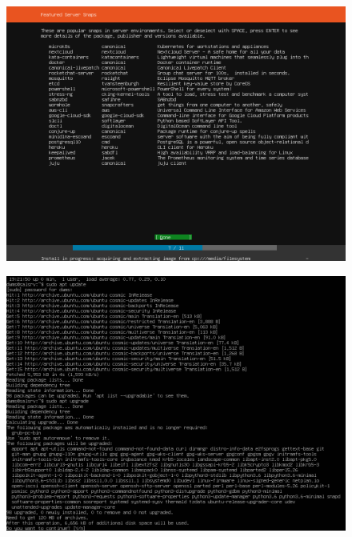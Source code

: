 \begin{figure}[h!]
\centering
\captionsetup{skip=\skipfigurecaptionlen}
\includegraphics[width=1\textwidth]{screenshots/IY2D502-2019-02-21-19-17-58.png}
\caption{}
\label{fig:IY2D502-2019-02-21-19-17-58}
\end{figure}
\pagebreak
\begin{figure}[h!]
\centering
\captionsetup{skip=\skipfigurecaptionlen}
\includegraphics[width=1\textwidth]{screenshots/IY2D502-2019-02-21-19-22-44.png}
\caption{}
\label{fig:IY2D502-2019-02-21-19-22-44}
\end{figure}
\pagebreak
